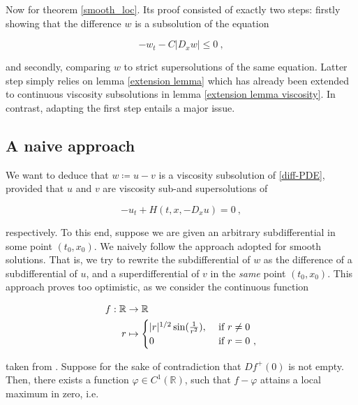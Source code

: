	Now for theorem \ref{smooth_loc}. Its proof consisted of exactly two steps: firstly showing that the difference $ w $ is a subsolution of the equation
	
	\begin{equation*}
		-w_t - C \lvert D_x w \rvert \leq 0 \ ,
	\end{equation*}
	
	and secondly, comparing $ w $ to strict supersolutions of the same equation. Latter step simply relies on lemma \ref{extension lemma} which has already been extended to continuous viscosity subsolutions in lemma \ref{extension lemma viscosity}. In contrast, adapting the first step entails a major issue. 

	\subsection{A naive approach}
		\label{naive}
		
		We want to deduce that $ w \coloneqq u - v $ is a viscosity subsolution of \eqref{diff-PDE}, provided that $ u $ and $ v $ are viscosity sub-and supersolutions of
		
		\begin{equation*}
				-u_t + H(t, x, -D_x u) = 0 \ ,
		\end{equation*}
		
		respectively. To this end, suppose we are given an arbitrary subdifferential in some point $ (t_0, x_0) $. We naively follow the approach adopted for smooth solutions. That is, we try to rewrite the subdifferential of $ w $ as the difference of a subdifferential of $ u $, and a superdifferential of $ v $ in the \emph{same} point $ (t_0, x_0) $. This approach proves too optimistic, as we consider the continuous function
		
		\begin{align*}
			f : \mathbb{R} &\to \mathbb{R} \\
			r &\mapsto \begin{cases}
			\lvert r \rvert^{1/2} \sin(\frac{1}{r^2}), &\hbox{ if } r \neq 0 \\
			0 &\hbox{ if } r = 0  \ ,
			\end{cases}
		\end{align*}
		
		taken from \cite[p.~32, exercise 1.5]{bardi2008optimal}. Suppose for the sake of contradiction that $ Df^{+}(0) $ is not empty. Then, there exists a function $ \varphi \in C^1(\mathbb{R}) $, such that $ f - \varphi $ attains a local maximum in zero, i.e.
		
